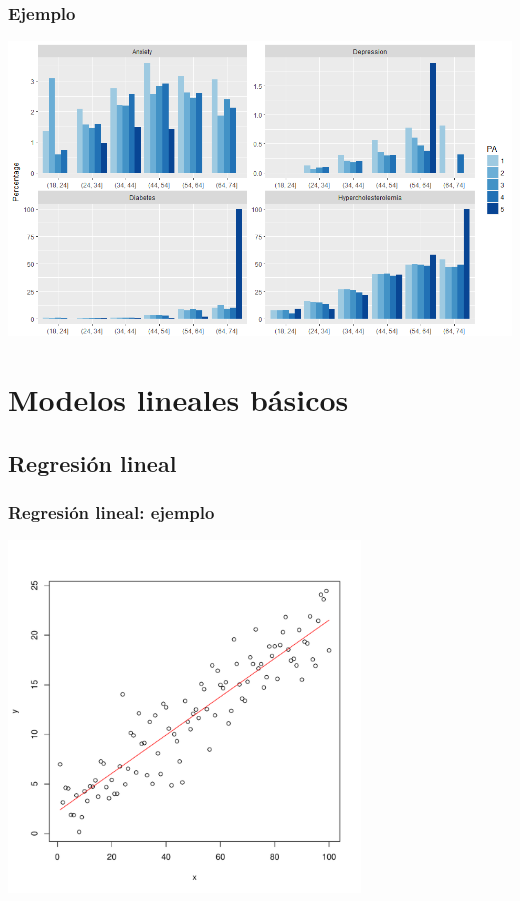 \documentclass{beamer}
\begin{document}
\begin{frame}
\frametitle{Ejemplo}

\begin{center}
\includegraphics[width=\textwidth]{PA.png}
\end{center}

\end{frame}


\section{Modelos lineales básicos}

\subsection{Regresión lineal}

\begin{frame}
\frametitle{Regresión lineal: ejemplo}

\centering
\includegraphics[width=0.7\textwidth]{linear_regression.pdf}
\end{frame}
\end{document}
